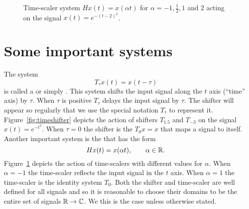 \begin{figure}[p]
  \centering
  \caption{Time-scaler system $Hx(t) = x(\alpha t)$ for $\alpha=-1,\tfrac{1}{2}, 1$ and $2$ acting on the signal $x(t) = e^{-(t-2)^2}$.} \label{fig:timescaler}
\end{figure}



\section{Some important systems}\label{sec:some-import-syst}

The system
\[
T_\tau x(t) = x(t - \tau)
\]
is called a  or simply .  This system shifts the input signal along the $t$ axis (``time'' axis) by $\tau$.  When $\tau$ is positive $T_{\tau}$ delays the input signal by $\tau$.  The shifter will appear so regularly that we use the special notation $T_\tau$ to represent it.  Figure~\ref{fig:timeshifter} depicts the action of shifters $T_{1.5}$ and $T_{-3}$ on the signal $x(t) = e^{-t^2}$.  When $\tau=0$ the shifter is the  $T_0 x = x$ that maps a signal to itself.  Another important system is the  that has the form
\[
H x(t) = x(\alpha t), \qquad \alpha \in {\mathbb R}.
\]
Figure~\ref{fig:timescaler} depicts the action of time-scalers with different values for $\alpha$.  When $\alpha=-1$ the time-scaler reflects the input signal in the $t$ axis.  When $\alpha = 1$ the time-scaler is the identity system $T_0$.  Both the shifter and time-scaler are well defined for all signals and so it is reasonable to choose their domains to be the entire set of signals ${\mathbb R} \to {\mathbb C}$.  We this is the case unless otherwise stated.

